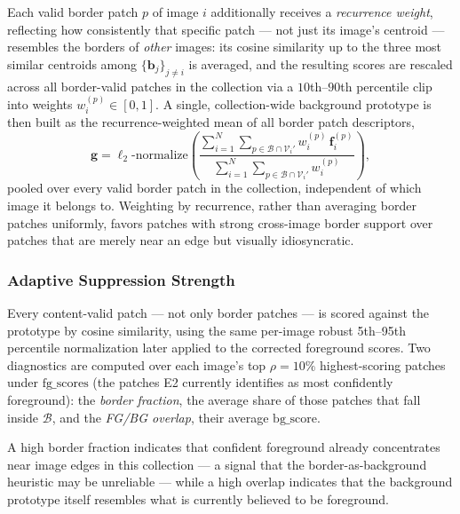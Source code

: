 Each valid border patch $p$ of image $i$ additionally receives a
\emph{recurrence weight}, reflecting how consistently that specific patch — not just its image's centroid — resembles the borders of \emph{other} images:
its cosine similarity up to the three most similar centroids among
$\{\mathbf{b}_j\}_{j\neq i}$ is averaged, and the resulting scores are
rescaled across all border-valid patches in the collection via a $10$th–$90$th percentile clip into weights $w_i^{(p)} \in [0,1]$. A single, collection-wide background prototype is then built as the recurrence-weighted mean of all border patch descriptors,
\begin{equation}
    \mathbf{g}
    =
    \ell_2\text{-normalize}
    \left(
        \frac{
            \displaystyle
            \sum_{i=1}^{N}
            \sum_{p \in \mathcal{B}\cap\mathcal{V}_i'}
            w_i^{(p)}\,\mathbf{f}_i^{(p)}
        }{
            \displaystyle
            \sum_{i=1}^{N}
            \sum_{p \in \mathcal{B}\cap\mathcal{V}_i'}
            w_i^{(p)}
        }
    \right),
    \label{eq:e2b-prototype}
\end{equation}
pooled over every valid border patch in the collection, independent of which image it belongs to. Weighting by recurrence, rather than averaging border patches uniformly, favors patches with strong cross-image border support over patches that are merely near an edge but visually idiosyncratic.

\subsubsection{Adaptive Suppression Strength}
\label{sec:e2b-strength}

Every content-valid patch — not only border patches — is scored against the prototype by cosine similarity, using the same per-image robust 5th–95th percentile normalization later applied to the corrected foreground scores. Two diagnostics are computed over each image's top $\rho=10\%$ highest-scoring patches under $\mathrm{fg\_scores}$ (the patches E2 currently identifies as most confidently foreground): the \emph{border fraction}, the average share of those patches that fall inside $\mathcal{B}$, and the \emph{FG/BG overlap}, their average $\mathrm{bg\_score}$.

A high border fraction indicates that confident foreground already
concentrates near image edges in this collection — a signal that the
border-as-background heuristic may be unreliable — while a high overlap
indicates that the background prototype itself resembles what is currently believed to be foreground.

